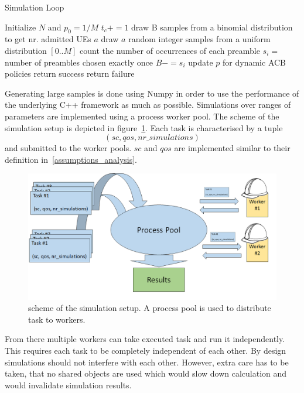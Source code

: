 \documentclass[conference]{IEEEtran}
\begin{document}
\begin{algorithm}
    \caption{Simulation Loop}\label{alg:iterator}
\begin{algorithmic}[1]
    \State Initialize $N$ and $p_0=1/M$
    \State $t_c+=1$
    \State draw B samples from a binomial distribution to get nr. admitted UEs $a$
    \State draw $a$ random integer samples from a uniform distribution $[0.. M]$
    \State count the number of occurrences of each preamble
    \State $s_i= $ number of preambles chosen exactly once
    \State $B -= s_i$
    \State update $p$ for dynamic ACB policies
    \EndWhile
    \State return success
    \Else
    \State return failure
    \EndIf
\end{algorithmic}
\end{algorithm}
Generating large samples is done using Numpy in order to use the performance of the underlying C++ framework as much as possible.
Simulations over ranges of parameters are implemented using a process worker pool.
The scheme of the simulation setup is depicted in figure~\ref{fig:pool}.
Each task is characterised by a tuple \[(sc, qos, nr\_simulations)\] and submitted to the worker pools.
$sc$ and $qos$ are implemented similar to their definition in~\ref{assumptions_analysis}.
\begin{figure}
    \centering
    \includegraphics[width = \columnwidth]{../Figures/process_pool_worker}
    \caption{scheme of the simulation setup. A process pool is used to distribute task to workers.}
    \label{fig:pool}
\end{figure}
From there multiple workers can take executed task and run it independently.
This requires each task to be completely independent of each other.
By design simulations should not interfere with each other.
However, extra care has to be taken, that no shared objects are used which would slow down calculation and would invalidate simulation results.
\end{document}
